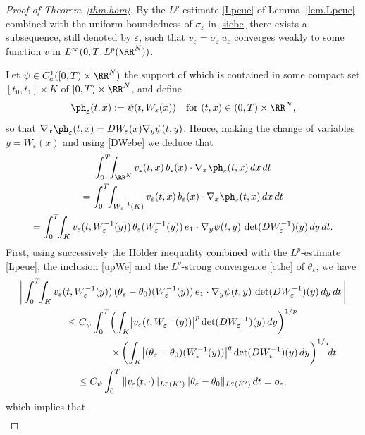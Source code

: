 \begin{proof}[Proof of Theorem~\ref{thm.hom}]
By the $L^p$-estimate \eqref{Lpeue} of Lemma~\ref{lem.Lpeue} combined with the uniform boundedness of $\sigma_\varepsilon$ in \eqref{siebe} there exists a subsequence, still denoted by $\varepsilon$, such that $v_\varepsilon=\sigma_\varepsilon\,u_\varepsilon$ converges weakly to some function $v$ in $L^\infty(0,T;L^p(\RR^N))$.

Let $\psi\in C^1_c([0,T)\times\RR^N)$ the support of which is contained in some compact set $[t_0,t_1]\times K$ of $[0,T)\times\RR^N$, and define
\begin{equation}\label{phe}
\ph_\varepsilon(t,x):=\psi(t, W_\varepsilon(x))\quad\mbox{for }(t,x)\in(0,T)\times\RR^N,
\end{equation}
so that $\nabla_x\ph_\varepsilon(t,x)=DW_\varepsilon(x)\nabla_y\psi(t,y)$.
Hence, making the change of variables $y=W_\varepsilon(x)$ and using \eqref{DWebe} we deduce that
\begin{multline}\label{vebe}
\int_0^T\!\!\int_{\RR^N}v_\varepsilon(t,x)\,b_\varepsilon(x)\cdot\nabla_x\ph_\varepsilon(t,x)\,dx\,dt\\
=\int_0^T\!\!\int_{W_\varepsilon^{-1}(K)}v_\varepsilon(t,x)\,b_\varepsilon(x)\cdot\nabla_x\ph_\varepsilon(t,x)\,dx\,dt
\\
=\int_0^T\!\!\int_Kv_\varepsilon(t,W_\varepsilon^{-1}(y))\,\theta_\varepsilon(W_\varepsilon^{-1}(y))\,e_1\cdot\nabla_y\psi(t,y)\,\det(DW_\varepsilon^{-1})(y)\,dy\,dt.
\end{multline}
First, using successively the Hölder inequality combined with the $L^p$-estimate \eqref{Lpeue}, the inclusion \eqref{upWe} and the $L^q$-strong convergence \eqref{cthe} of $\theta_\varepsilon$, we have
\begin{multline*}
\biggl|\,\int_0^T\!\!\int_{K}v_\varepsilon(t,W_\varepsilon^{-1}(y))\,(\theta_\varepsilon-\theta_0)(W_\varepsilon^{-1}(y))\,e_1\cdot\nabla_y\psi(t,y)\,\det(DW_\varepsilon^{-1})(y)\,dy\,dt\,\biggr|
\\
\leq C_\psi \int_0^T\!\left(\int_{K}\!\big|v_\varepsilon(t,W_\varepsilon^{-1}(y))\big|^p\det(DW_\varepsilon^{-1})(y)\,dy\right)^{1/ p}
\\
\shoveright{\times\left(\int_{K}\!\big|(\theta_\varepsilon-\theta_0)(W_\varepsilon^{-1}(y))\big|^q\det(DW_\varepsilon^{-1})(y)\,dy\right)^{1/ q}\!\!dt}
\\
\leq C_\psi\int_0^T\|v_\varepsilon(t,\cdot)\|_{L^p(K')}\|\theta_\varepsilon-\theta_0\|_{L^q(K')}\,dt=o_\varepsilon,
\end{multline*}
which implies that
\begin{multline*}

\end{multline*}
\end{proof}
